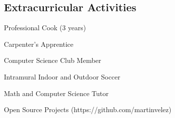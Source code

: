 \subsection*{Extracurricular Activities}

\begin{itemize*}
	\item Professional Cook (3 years)
	\item Carpenter's Apprentice
	\item Computer Science Club Member
	\item Intramural Indoor and Outdoor Soccer
	\item Math and Computer Science Tutor 
	\item Open Source Projects (https://github.com/martinvelez)
\end{itemize*}
